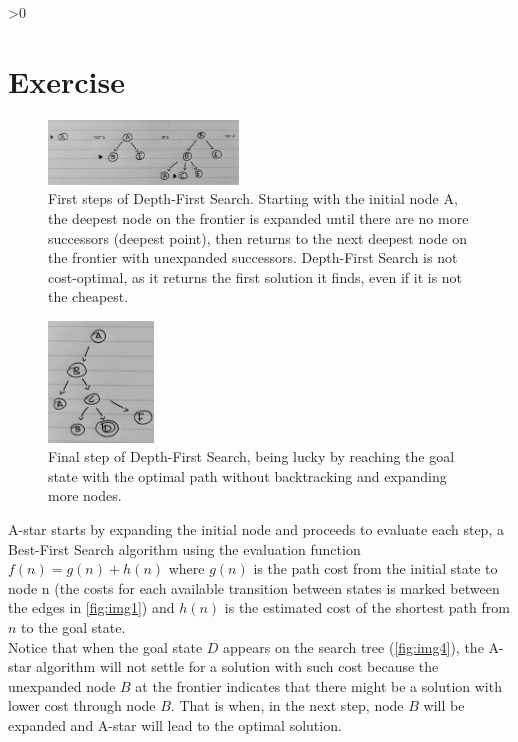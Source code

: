 \documentclass{article}
\newcounter{partCounter}
\newcounter{ExerciseCounter}
\newenvironment{Exercise}[1][-1]{
	\ifnum#1>0
	\setcounter{ExerciseCounter}{#1}
	\fi
	\section{Exercise \arabic{ExerciseCounter}}
	\setcounter{partCounter}{1}
}{
}
\begin{document}
\begin{Exercise}[2]
		\begin{figure}[h]
			\centering
			\includegraphics[width=0.45\textwidth]{images/2.jpg}
			\caption{First steps of Depth-First Search. Starting with the initial node A, the deepest node on the frontier is expanded until there are no more successors (deepest point), then returns to the next deepest node on the frontier with unexpanded successors. Depth-First Search is not cost-optimal, as it returns the first solution it finds, even if it is not the cheapest. }
			\label{fig:img2}
		\end{figure}
		
		\begin{figure}[h]
			\centering
			\includegraphics[width=0.25\textwidth]{images/3.jpg}
			\caption{Final step of Depth-First Search, being lucky by reaching the goal state with the optimal path without backtracking and expanding more nodes.}
			\label{fig:img3}
		\end{figure}
	
	    
	    A-star starts by expanding the initial node and proceeds to evaluate each step, a Best-First Search algorithm using the evaluation function $f(n) = g(n) + h(n)$ where $g(n)$ is the path cost from the initial state to node n (the costs for each available transition between states is marked between the edges in \ref{fig:img1}) and $h(n)$ is the estimated cost of the shortest path from $n$ to the goal state. \\
	    
	    Notice that when the goal state $D$ appears on the search tree (\ref{fig:img4}), the A-star algorithm will not settle for a solution with such cost because the unexpanded node $B$ at the frontier indicates that there might be a solution with lower cost through node $B$. That is when, in the next step, node $B$ will be expanded and A-star will lead to the optimal solution. \\
	    

\end{Exercise}
\end{document}
